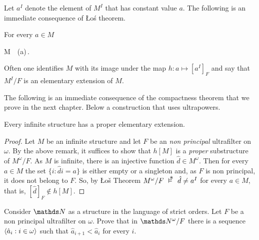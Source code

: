 \documentclass[creche.tex]{subfiles}
\begin{document}
Let \emph{$a^I$\/} denote the element of $M^I$ that has constant value $a$. The following is an immediate consequence of \L o\'{s} theorem.

\begin{corollary}\label{ultrapotenzeelementari}
For every $a\in M$

%
{\IFF}%
{M\ \models\ \phi(a)\,.}\QED
\end{corollary}


Often one identifies $M$ with its image under the map $h:a\mapsto [a^I]_F$ and say that $M^I/F$ is an elementary extension of $M$.

The following is an immediate consequence of the compactness theorem that we prove in the next chapter. Below a construction that uses ultrapowers.

\begin{corollary}
Every infinite structure has a proper elementary extension.
\end{corollary}

\begin{proof}
Let $M$ be an infinite structure and let $F$ be an \textit{non principal\/} ultrafilter on $\omega$. By the above remark, it suffices to show that $h[M]$ is a \textit{proper\/} substructure of $M^\omega/F$.  As $M$ is infinite, there is an injective function  $\hat d\in M^\omega$. Then for every $a\in M$ the set $\big\{i:\hat di=a\big\}$ is either empty or a singleton and, as $F$ is non principal, it does not belong to $F$. So, by \L o\v{s} Theorem $M^\omega/F\ \pmodels\ \hat d\neq a^I$ for every $a\in M$, that is, $[\hat d]_F\notin h[M]$.
\end{proof}


\begin{exercise}
Consider $\NN$ as a structure in the language of strict orders.  Let $F$ be a non principal ultrafilter on $\omega$. Prove that in $\NN^\omega/F$ there is a sequence $\langle\hat a_i: i\in\omega\rangle$ such that $\hat a_{i+1}<\hat a_i$ for every $i$.\QED 
\end{exercise}
\end{document}
